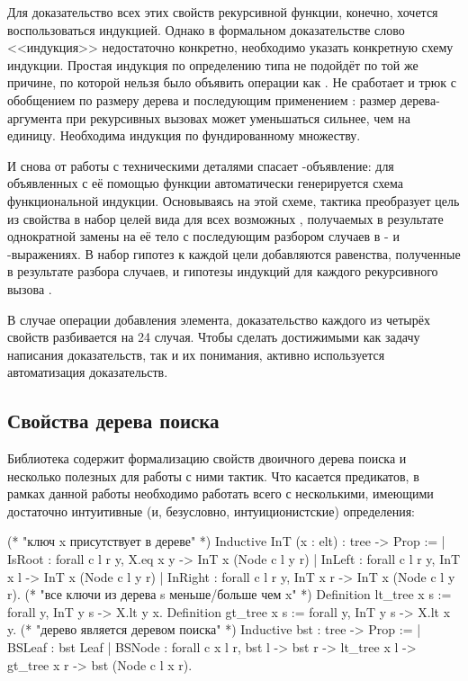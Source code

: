 \documentclass[a4paper,14pt]{extarticle}
\begin{document}
Для доказательство всех этих свойств рекурсивной функции,
конечно, хочется воспользоваться индукцией.
Однако в формальном доказательстве слово <<индукция>>
недостаточно конкретно, необходимо указать конкретную схему индукции.
Простая индукция по определению типа  не подойдёт
по той же причине, по которой нельзя было объявить
операции как .
Не сработает и трюк с обобщением по размеру дерева и
последующим применением :
размер дерева-аргумента при рекурсивных вызовах
может уменьшаться сильнее, чем на единицу.
Необходима индукция по фундированному множеству.

И снова от работы с техническими деталями
спасает -объявление:
для объявленных с её помощью функции
автоматически генерируется схема функциональной индукции.
Основываясь на этой схеме,
тактика 
преобразует цель из свойства 
в набор целей вида  для
всех возможных ,
получаемых в результате однократной замены 
на её тело с последующим разбором случаев в
- и -выражениях.
В набор гипотез к каждой цели добавляются
равенства, полученные в результате разбора случаев,
и гипотезы индукций для каждого рекурсивного вызова .

В случае операции добавления элемента,
доказательство каждого из четырёх
свойств разбивается на 24 случая.
Чтобы сделать достижимыми как задачу написания доказательств,
так и их понимания,
активно используется автоматизация доказательств.

\subsection{Свойства дерева поиска}

Библиотека  содержит
формализацию свойств двоичного дерева поиска
и несколько полезных для работы с ними тактик.
Что касается предикатов, в рамках данной работы
необходимо работать всего с несколькими,
имеющими достаточно интуитивные (и, безусловно, интуиционистские)
определения:

\begin{coqcode}
(* "ключ x присутствует в дереве" *)
Inductive InT (x : elt) : tree -> Prop :=
  | IsRoot : forall c l r y, X.eq x y
     -> InT x (Node c l y r)
  | InLeft : forall c l r y, InT x l
     -> InT x (Node c l y r)
  | InRight : forall c l r y, InT x r
     -> InT x (Node c l y r).
(* "все ключи из дерева s меньше/больше чем x" *)
Definition lt_tree x s := forall y, InT y s -> X.lt y x.
Definition gt_tree x s := forall y, InT y s -> X.lt x y.
(* "дерево является деревом поиска" *)
Inductive bst : tree -> Prop :=
  | BSLeaf : bst Leaf
  | BSNode : forall c x l r, bst l -> bst r ->
     lt_tree x l -> gt_tree x r -> bst (Node c l x r).
\end{coqcode}
\end{document}
